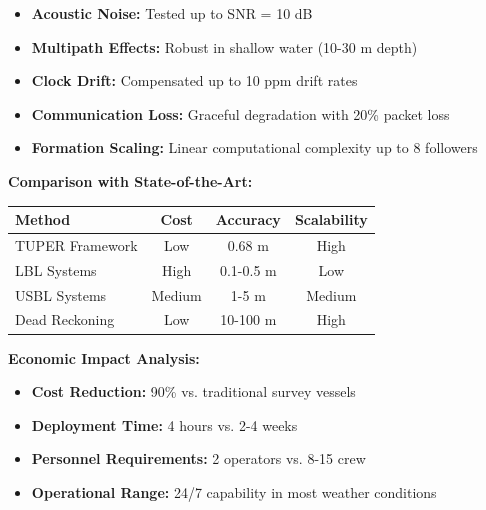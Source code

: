 \begin{itemize}[leftmargin=1em, itemsep=0.1em]
    \item \textbf{Acoustic Noise:} Tested up to SNR = 10 dB
    \item \textbf{Multipath Effects:} Robust in shallow water (10-30 m depth)
    \item \textbf{Clock Drift:} Compensated up to 10 ppm drift rates
    \item \textbf{Communication Loss:} Graceful degradation with 20\% packet loss
    \item \textbf{Formation Scaling:} Linear computational complexity up to 8 followers
\end{itemize}

\vspace{0.3em}

\textbf{Comparison with State-of-the-Art:}

\begin{tcolorbox}[colback=wasppink!10, colframe=wasppink, boxrule=0.5pt]
\begin{tabular}{|l|c|c|c|}
\hline
\textbf{Method} & \textbf{Cost} & \textbf{Accuracy} & \textbf{Scalability} \\
\hline
TUPER Framework & Low & 0.68 m & High \\
LBL Systems & High & 0.1-0.5 m & Low \\
USBL Systems & Medium & 1-5 m & Medium \\
Dead Reckoning & Low & 10-100 m & High \\
\hline
\end{tabular}
\end{tcolorbox}

\vspace{0.3em}

\textbf{Economic Impact Analysis:}

\begin{itemize}[leftmargin=1em, itemsep=0.1em]
    \item \textbf{Cost Reduction:} 90\% vs. traditional survey vessels
    \item \textbf{Deployment Time:} 4 hours vs. 2-4 weeks
    \item \textbf{Personnel Requirements:} 2 operators vs. 8-15 crew
    \item \textbf{Operational Range:} 24/7 capability in most weather conditions
\end{itemize}
